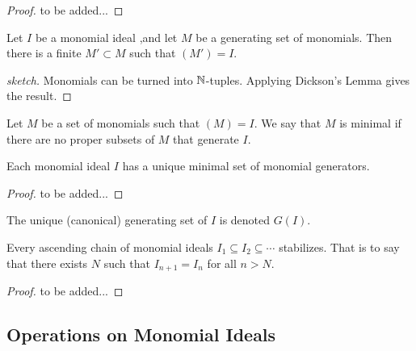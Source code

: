 \begin{proof}
to be added...
\end{proof}

\begin{corollary}
Let $I$ be a monomial ideal ,and let $M $ be a generating set of monomials. Then there is a finite $M ' \subset M$ such that $(M') = I$.
\end{corollary}

\begin{proof}[sketch]
Monomials can be turned into $\mathbb{N}$-tuples. Applying Dickson's Lemma gives the result.
\end{proof}

\begin{definition}
Let $M$ be a set of monomials such that $(M) = I$. We say that $M$ is minimal if there are no proper subsets of $M$ that generate $I$.
\end{definition}

\begin{proposition}
Each monomial ideal $I$ has a unique minimal set of monomial generators.
\end{proposition}

\begin{proof}
to be added...
\end{proof}

The unique (canonical) generating set of $I$ is denoted $G(I)$.

\begin{proposition}\label{monoStab}
Every ascending chain of monomial ideals $I_1 \subseteq I_2 \subseteq \cdots$ stabilizes. That is to say that there exists $N$ such that $I_{n+1 } = I_n$ for all $n > N$.
\end{proposition}


\begin{proof}
to be added...
\end{proof}


\subsection{Operations on Monomial Ideals}

